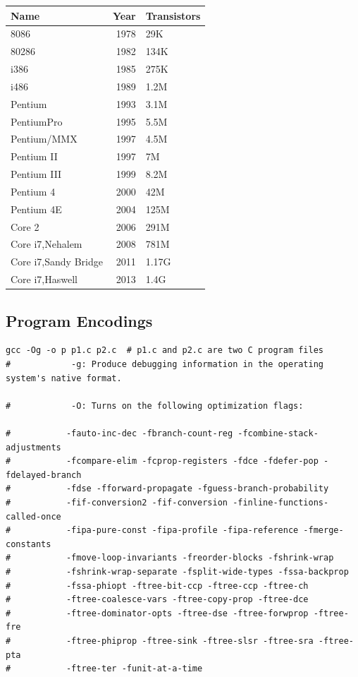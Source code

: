 \documentclass[11pt]{article}
\begin{document}
\begin{center}
\begin{tabular}{lrl}
Name & Year & Transistors\\
\hline
8086 & 1978 & 29K\\
80286 & 1982 & 134K\\
i386 & 1985 & 275K\\
i486 & 1989 & 1.2M\\
Pentium & 1993 & 3.1M\\
PentiumPro & 1995 & 5.5M\\
Pentium/MMX & 1997 & 4.5M\\
Pentium II & 1997 & 7M\\
Pentium III & 1999 & 8.2M\\
Pentium 4 & 2000 & 42M\\
Pentium 4E & 2004 & 125M\\
Core 2 & 2006 & 291M\\
Core i7,Nehalem & 2008 & 781M\\
Core i7,Sandy Bridge & 2011 & 1.17G\\
Core i7,Haswell & 2013 & 1.4G\\
\end{tabular}
\end{center}

\subsection{Program Encodings}
\label{sec:org603b798}
\begin{verbatim}
gcc -Og -o p p1.c p2.c  # p1.c and p2.c are two C program files
#            -g: Produce debugging information in the operating system's native format.

#            -O: Turns on the following optimization flags:

#           -fauto-inc-dec -fbranch-count-reg -fcombine-stack-adjustments
#           -fcompare-elim -fcprop-registers -fdce -fdefer-pop -fdelayed-branch
#           -fdse -fforward-propagate -fguess-branch-probability
#           -fif-conversion2 -fif-conversion -finline-functions-called-once
#           -fipa-pure-const -fipa-profile -fipa-reference -fmerge-constants
#           -fmove-loop-invariants -freorder-blocks -fshrink-wrap
#           -fshrink-wrap-separate -fsplit-wide-types -fssa-backprop
#           -fssa-phiopt -ftree-bit-ccp -ftree-ccp -ftree-ch
#           -ftree-coalesce-vars -ftree-copy-prop -ftree-dce
#           -ftree-dominator-opts -ftree-dse -ftree-forwprop -ftree-fre
#           -ftree-phiprop -ftree-sink -ftree-slsr -ftree-sra -ftree-pta
#           -ftree-ter -funit-at-a-time
\end{verbatim}
\end{document}
